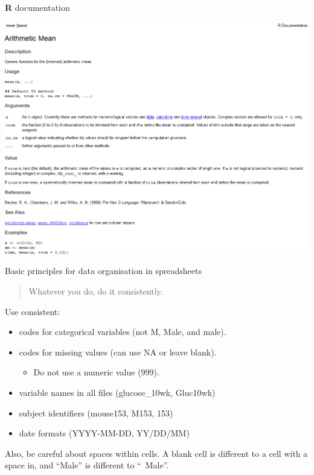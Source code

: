 \documentclass[ignorenonframetext,]{beamer}
\providecommand{\tightlist}{%
  \setlength{\itemsep}{0pt}\setlength{\parskip}{0pt}}
\begin{document}
\begin{frame}{\textbf{R} documentation}

\center \includegraphics{Figure/mean function.png}

\end{frame}

\begin{frame}{Basic principles for data organisation in spreadsheets}

\begin{quote}
Whatever you do, do it consistently.
\end{quote}

Use consistent:

\begin{itemize}
\item
  codes for categorical variables (not M, Male, and male).
\item
  codes for missing values (can use NA or leave blank).

  \begin{itemize}
  \tightlist
  \item
    Do not use a numeric value (999).
  \end{itemize}
\item
  variable names in all files (glucose\_10wk, Gluc10wk)
\item
  subject identifiers (mouse153, M153, 153)
\item
  date formats (YYYY-MM-DD, YY/DD/MM)
\end{itemize}

Also, be careful about spaces within cells. A blank cell is different to
a cell with a space in, and ``Male'' is different to ``~Male''.

\end{frame}
\end{document}
